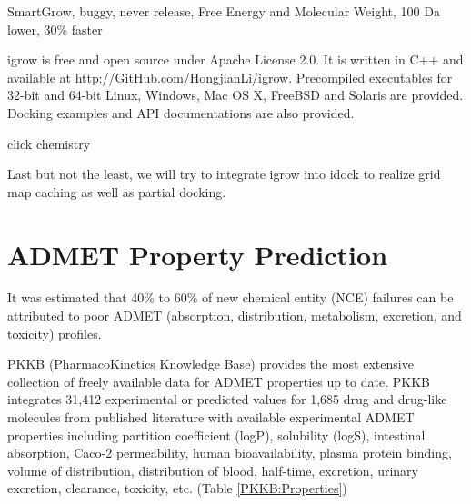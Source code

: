 SmartGrow, buggy, never release, Free Energy and Molecular Weight, 100 Da lower, 30\% faster

igrow is free and open source under Apache License 2.0. It is written in C++ and available at http://GitHub.com/HongjianLi/igrow. Precompiled executables for 32-bit and 64-bit Linux, Windows, Mac OS X, FreeBSD and Solaris are provided. Docking examples and API documentations are also provided.

click chemistry

Last but not the least, we will try to integrate igrow into idock to realize grid map caching as well as partial docking. 

\section{ADMET Property Prediction}

It was estimated that 40\% to 60\% of new chemical entity (NCE) failures can be attributed to poor ADMET (absorption, distribution, metabolism, excretion, and toxicity) profiles.

PKKB (PharmacoKinetics Knowledge Base) \citep{1133} provides the most extensive collection of freely available data for ADMET properties up to date. PKKB integrates 31,412 experimental or predicted values for 1,685 drug and drug-like molecules from published literature with available experimental ADMET properties including partition coefficient (logP), solubility (logS), intestinal absorption, Caco-2 permeability, human bioavailability, plasma protein binding, volume of distribution, distribution of blood, half-time, excretion, urinary excretion, clearance, toxicity, etc. (Table \ref{PKKB:Properties})

